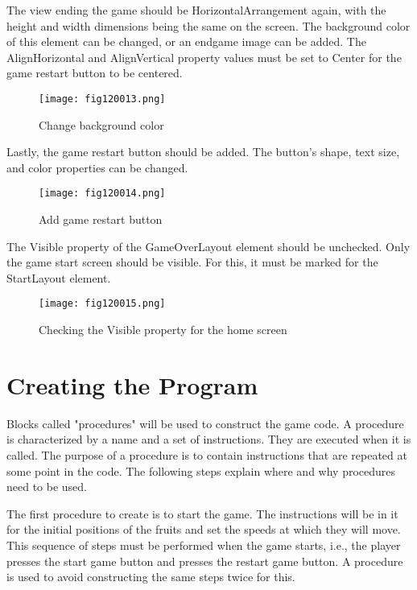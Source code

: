 The view ending the game should be HorizontalArrangement again, with the height and width dimensions being the same on the screen. The background color of this element can be changed, or an endgame image can be added. The AlignHorizontal and AlignVertical property values must be set to Center for the game restart button to be centered.

\begin{figure}[H]
   \centering
   \texttt{[image: fig120013.png]}
   \caption{Change background color}
\label{fig120013}
\end{figure}

Lastly, the game restart button should be added. The button's shape, text size, and color properties can be changed.

\begin{figure}[H]
   \centering
   \texttt{[image: fig120014.png]}
   \caption{Add game restart button}
\label{fig120014}
\end{figure}

The Visible property of the GameOverLayout element should be unchecked. Only the game start screen should be visible. For this, it must be marked for the StartLayout element.

\begin{figure}[H]
   \centering
   \texttt{[image: fig120015.png]}
   \caption{Checking the Visible property for the home screen}
\label{fig120015}
\end{figure}

\section{Creating the Program}
Blocks called "procedures" will be used to construct the game code. A procedure is characterized by a name and a set of instructions. They are executed when it is called. The purpose of a procedure is to contain instructions that are repeated at some point in the code. The following steps explain where and why procedures need to be used.

The first procedure to create is to start the game. The instructions will be in it for the initial positions of the fruits and set the speeds at which they will move. This sequence of steps must be performed when the game starts, i.e., the player presses the start game button and presses the restart game button. A procedure is used to avoid constructing the same steps twice for this.

